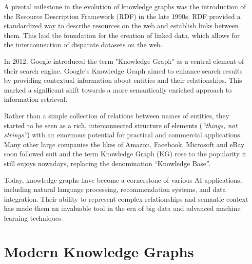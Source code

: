 A pivotal milestone in the evolution of knowledge graphs was the introduction of the Resource Description Framework (RDF) in the late 1990s. RDF provided a standardized way to describe resources on the web and establish links between them. This laid the foundation for the creation of linked data, which allows for the interconnection of disparate datasets on the web.

In 2012, Google introduced the term "Knowledge Graph" as a central element of their search engine. Google's Knowledge Graph aimed to enhance search results by providing contextual information about entities and their relationships. This marked a significant shift towards a more semantically enriched approach to information retrieval.

Rather than a simple collection of relations between names of entities, they started to be seen as a rich, interconnected structure of elements (\textit{``things, not strings''}) with an enormous potential for practical and commercial applications. Many other large companies the likes of Amazon, Facebook, Microsoft and eBay soon followed suit 
and the term Knowledge Graph (KG) rose to the popularity it still enjoys nowadays, replacing the denomination ``Knowledge Base''.

Today, knowledge graphs have become a cornerstone of various AI applications, including natural language processing, recommendation systems, and data integration. Their ability to represent complex relationships and semantic context has made them an invaluable tool in the era of big data and advanced machine learning techniques.

\section{Modern Knowledge Graphs}\label{sec:kgs-current}

